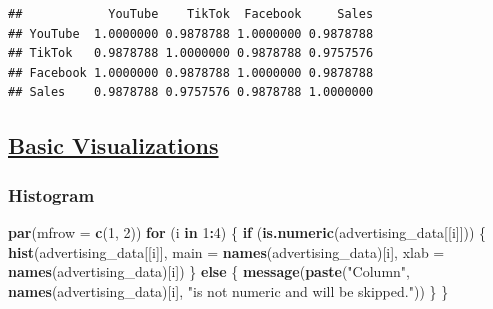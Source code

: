 \documentclass[
]{article}
\newenvironment{Shaded}{\begin{snugshade}}{\end{snugshade}}
\newcommand{\AttributeTok}[1]{\textcolor[rgb]{0.13,0.29,0.53}{#1}}
\newcommand{\ControlFlowTok}[1]{\textcolor[rgb]{0.13,0.29,0.53}{\textbf{#1}}}
\newcommand{\DecValTok}[1]{\textcolor[rgb]{0.00,0.00,0.81}{#1}}
\newcommand{\FunctionTok}[1]{\textcolor[rgb]{0.13,0.29,0.53}{\textbf{#1}}}
\newcommand{\NormalTok}[1]{#1}
\newcommand{\SpecialCharTok}[1]{\textcolor[rgb]{0.81,0.36,0.00}{\textbf{#1}}}
\newcommand{\StringTok}[1]{\textcolor[rgb]{0.31,0.60,0.02}{#1}}
\begin{document}
\begin{verbatim}
##            YouTube    TikTok  Facebook     Sales
## YouTube  1.0000000 0.9878788 1.0000000 0.9878788
## TikTok   0.9878788 1.0000000 0.9878788 0.9757576
## Facebook 1.0000000 0.9878788 1.0000000 0.9878788
## Sales    0.9878788 0.9757576 0.9878788 1.0000000
\end{verbatim}

\subsection{\texorpdfstring{\ul{\textbf{Basic
Visualizations}}}{Basic Visualizations}}\label{basic-visualizations}

\subsubsection{\texorpdfstring{\textbf{Histogram}}{Histogram}}\label{histogram}

\begin{Shaded}
\begin{Highlighting}[]
\FunctionTok{par}\NormalTok{(}\AttributeTok{mfrow =} \FunctionTok{c}\NormalTok{(}\DecValTok{1}\NormalTok{, }\DecValTok{2}\NormalTok{))}
\ControlFlowTok{for}\NormalTok{ (i }\ControlFlowTok{in} \DecValTok{1}\SpecialCharTok{:}\DecValTok{4}\NormalTok{) \{}
  \ControlFlowTok{if}\NormalTok{ (}\FunctionTok{is.numeric}\NormalTok{(advertising\_data[[i]])) \{}
    \FunctionTok{hist}\NormalTok{(advertising\_data[[i]],}
         \AttributeTok{main =} \FunctionTok{names}\NormalTok{(advertising\_data)[i],}
         \AttributeTok{xlab =} \FunctionTok{names}\NormalTok{(advertising\_data)[i])}
\NormalTok{  \} }\ControlFlowTok{else}\NormalTok{ \{}
    \FunctionTok{message}\NormalTok{(}\FunctionTok{paste}\NormalTok{(}\StringTok{"Column"}\NormalTok{, }\FunctionTok{names}\NormalTok{(advertising\_data)[i], }\StringTok{"is not numeric and will be skipped."}\NormalTok{))}
\NormalTok{  \}}
\NormalTok{\}}
\end{Highlighting}
\end{Shaded}
\end{document}
